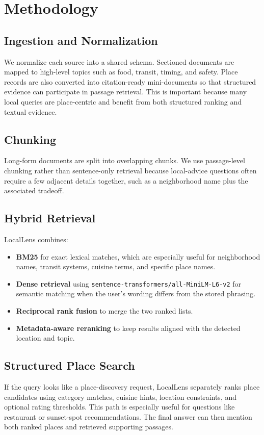 \documentclass[11pt]{article}
\begin{document}
\section{Methodology}
\subsection{Ingestion and Normalization}
We normalize each source into a shared schema. Sectioned documents are mapped to high-level topics such as food, transit, timing, and safety. Place records are also converted into citation-ready mini-documents so that structured evidence can participate in passage retrieval. This is important because many local queries are place-centric and benefit from both structured ranking and textual evidence.

\subsection{Chunking}
Long-form documents are split into overlapping chunks. We use passage-level chunking rather than sentence-only retrieval because local-advice questions often require a few adjacent details together, such as a neighborhood name plus the associated tradeoff.

\subsection{Hybrid Retrieval}
LocalLens combines:
\begin{itemize}[leftmargin=*]
    \item \textbf{BM25} for exact lexical matches, which are especially useful for neighborhood names, transit systems, cuisine terms, and specific place names.
    \item \textbf{Dense retrieval} using \texttt{sentence-transformers/all-MiniLM-L6-v2} for semantic matching when the user's wording differs from the stored phrasing.
    \item \textbf{Reciprocal rank fusion} to merge the two ranked lists.
    \item \textbf{Metadata-aware reranking} to keep results aligned with the detected location and topic.
\end{itemize}

\subsection{Structured Place Search}
If the query looks like a place-discovery request, LocalLens separately ranks place candidates using category matches, cuisine hints, location constraints, and optional rating thresholds. This path is especially useful for questions like restaurant or sunset-spot recommendations. The final answer can then mention both ranked places and retrieved supporting passages.
\end{document}
